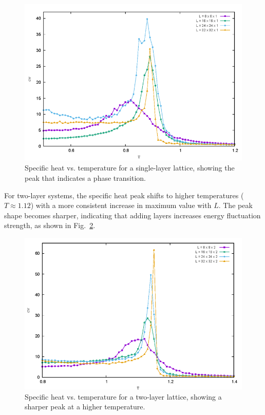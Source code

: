 \documentclass[conference, compsoc, twoside]{IEEEtran}
\begin{document}
\begin{figure}[t]
    \centering
    \includegraphics[width=0.9\columnwidth]{Gambar 9. Cv vs T pada Kisi Satu Lapis.png}
    \caption{Specific heat vs. temperature for a single-layer lattice, showing the peak that indicates a phase transition.}
    \label{fig:cv_single_layer}
\end{figure}

For two-layer systems, the specific heat peak shifts to higher temperatures ($T \approx 1.12$) with a more consistent increase in maximum value with $L$. The peak shape becomes sharper, indicating that adding layers increases energy fluctuation strength, as shown in Fig.~\ref{fig:cv_two_layer}.

\begin{figure}[t]
    \centering
    \includegraphics[width=0.9\columnwidth]{Gambar 10. Cv vs T pada Kisi 2 Lapis.png}
    \caption{Specific heat vs. temperature for a two-layer lattice, showing a sharper peak at a higher temperature.}
    \label{fig:cv_two_layer}
\end{figure}
\end{document}
